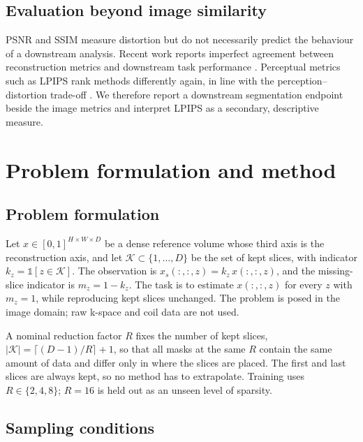 \documentclass[a4paper,fleqn]{cas-dc}
\begin{document}
\subsection{Evaluation beyond image similarity}

PSNR and SSIM \citep{wang2004ssim} measure distortion but do not necessarily predict the
behaviour of a downstream analysis. Recent work reports imperfect agreement between
reconstruction metrics and downstream task performance \citep{wohlrapp2026downstream}.
Perceptual metrics such as LPIPS \citep{zhang2018lpips} rank methods differently again, in
line with the perception--distortion trade-off \citep{blau2018perception}. We therefore
report a downstream segmentation endpoint beside the image metrics and interpret LPIPS as a
secondary, descriptive measure.

\section{Problem formulation and method}
\label{sec:method}

\subsection{Problem formulation}
\label{sec:formulation}

Let $x\in[0,1]^{H\times W\times D}$ be a dense reference volume whose third axis is the
reconstruction axis, and let $\mathcal{K}\subset\{1,\dots,D\}$ be the set of kept slices,
with indicator $k_z=\mathbb{1}[z\in\mathcal{K}]$. The observation is
$x_s(:,:,z)=k_z\,x(:,:,z)$, and the missing-slice indicator is $m_z=1-k_z$. The task is to
estimate $x(:,:,z)$ for every $z$ with $m_z=1$, while reproducing kept slices unchanged. The
problem is posed in the image domain; raw k-space and coil data are not used.

A nominal reduction factor $R$ fixes the number of kept slices, $|\mathcal{K}|=\lceil (D-1)/R
\rceil+1$, so that all masks at the same $R$ contain the same amount of data and differ only
in where the slices are placed. The first and last slices are always kept, so no method has to
extrapolate. Training uses $R\in\{2,4,8\}$; $R=16$ is held out as an unseen level of sparsity.

\subsection{Sampling conditions}
\label{sec:families}
\end{document}
